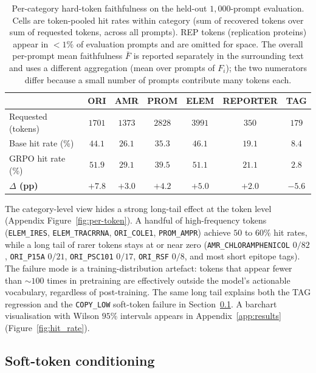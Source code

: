 \documentclass{article}
\begin{document}
\begin{table}[t]
  \caption{Per-category hard-token faithfulness on the held-out $1{,}000$-prompt
    evaluation. Cells are token-pooled hit rates within category (sum of recovered
    tokens over sum of requested tokens, across all prompts). REP tokens (replication
    proteins) appear in $<1\%$ of evaluation prompts and are omitted for space. The
    overall per-prompt mean faithfulness $\bar F$ is reported separately in the
    surrounding text and uses a different aggregation (mean over prompts of $F_i$); the
    two numerators differ because a small number of prompts contribute many tokens each.}
  \label{tab:conditional}
  \centering
  \small
  \begin{tabular}{lcccccc}
    \toprule
    & ORI & AMR & PROM & ELEM & REPORTER & TAG \\
    \midrule
    Requested (tokens)   & $1701$ & $1373$ & $2828$ & $3991$ & $350$ & $179$ \\
    Base hit rate (\%)   & $44.1$ & $26.1$ & $35.3$ & $46.1$ & $19.1$ & $8.4$ \\
    GRPO hit rate (\%)   & $\mathbf{51.9}$ & $\mathbf{29.1}$ & $\mathbf{39.5}$ &
    $\mathbf{51.1}$ & $\mathbf{21.1}$ & $2.8$ \\
    \textbf{$\Delta$ (pp)} & $\mathbf{+7.8}$ & $+3.0$ & $+4.2$ & $+5.0$ & $+2.0$ &
    $-5.6$ \\
    \bottomrule
  \end{tabular}
\end{table}

The category-level view hides a strong long-tail effect at the token level (Appendix
Figure~\ref{fig:per-token}). A handful of high-frequency tokens (\texttt{ELEM\_IRES},
\texttt{ELEM\_TRACRRNA}, \texttt{ORI\_COLE1}, \texttt{PROM\_AMPR}) achieve $50$ to $60\%$
hit rates, while a long tail of rarer tokens stays at or near zero
(\texttt{AMR\_CHLORAMPHENICOL} $0/82$, \texttt{ORI\_P15A} $0/21$, \texttt{ORI\_PSC101}
$0/17$, \texttt{ORI\_RSF} $0/8$, and most short epitope tags). The failure mode is a
training-distribution artefact: tokens that appear fewer than $\sim\!100$ times in
pretraining are effectively outside the model's actionable vocabulary, regardless of
post-training. The same long tail explains both the TAG regression and the
\texttt{COPY\_LOW} soft-token failure in Section~\ref{sec:soft-tokens}. A barchart
visualisation with Wilson $95\%$ intervals appears in Appendix~\ref{app:results}
(Figure~\ref{fig:hit_rate}).

\subsection{Soft-token conditioning}
\label{sec:soft-tokens}
\end{document}
